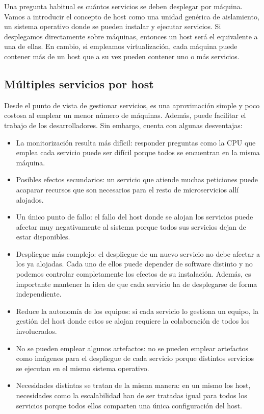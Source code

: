 \documentclass[11pt,a4paper]{article}
\begin{document}
Una pregunta habitual es cuántos servicios se deben desplegar por máquina. Vamos a introducir el concepto de host como una unidad genérica de aislamiento, un sistema operativo donde se pueden instalar y ejecutar servicios. Si desplegamos directamente sobre máquinas, entonces un host será el equivalente a una de ellas. En cambio, si empleamos virtualización, cada máquina puede contener más de un host que a su vez pueden contener uno o más servicios. 

\subsection{Múltiples servicios por host}

Desde el punto de vista de gestionar servicios, es una aproximación simple y poco costosa al emplear un menor número de máquinas. Además, puede facilitar el trabajo de los desarrolladores. Sin embargo, cuenta con algunas desventajas:

\begin{itemize}

\item La monitorización resulta más difícil: responder preguntas como la CPU que emplea cada servicio puede ser difícil porque todos se encuentran en la misma máquina.

\item Posibles efectos secundarios: un servicio que atiende muchas peticiones puede acaparar recursos que son necesarios para el resto de microservicios allí alojados.

\item Un único punto de fallo: el fallo del host donde se alojan los servicios puede afectar muy negativamente al sistema porque todos sus servicios dejan de estar disponibles.

\item Despliegue más complejo: el despliegue de un nuevo servicio no debe afectar a los ya alojadas. Cada uno de ellos puede depender de software distinto y no podemos controlar completamente los efectos de su instalación. Además, es importante mantener la idea de que cada servicio ha de desplegarse de forma independiente.

\item Reduce la autonomía de los equipos: si cada servicio lo gestiona un equipo, la gestión del host donde estos se alojan requiere la colaboración de todos los involucrados.

\item No se pueden emplear algunos artefactos: no se pueden emplear artefactos como imágenes para el despliegue de cada servicio porque distintos servicios se ejecutan en el mismo sistema operativo.

\item Necesidades distintas se tratan de la misma manera: en un mismo los host, necesidades como la escalabilidad han de ser tratadas igual para todos los servicios porque todos ellos comparten una única configuración del host.

\end{itemize}
\end{document}
